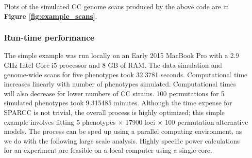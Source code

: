 Plots of the simulated CC genome scans produced by the above code are in \textbf{Figure \ref{fig:example_scans}}.

\subsubsection{Run-time performance}

The simple example was run locally on an Early 2015 MacBook Pro with a 2.9 GHz Intel Core i5 processor and 8 GB of RAM. The data simulation and genome-wide scans for five phenotypes took 32.3781 seconds. Computational time increases linearly with number of phenotypes simulated. Computational times will also decrease for lower numbers of CC strains. 100 permutations for 5 simulated phenotypes took 9.315485 minutes. Although the time expense for SPARCC is not trivial, the overall process is highly optimized; this simple example involves fitting 5 phenotypes $\times$ 17900 loci $\times$ 100 permutation alternative models. The process can be sped up using a parallel computing environment, as we do with the following large scale analysis. Highly specific power calculations for an experiment are feasible on a local computer using a single core.

